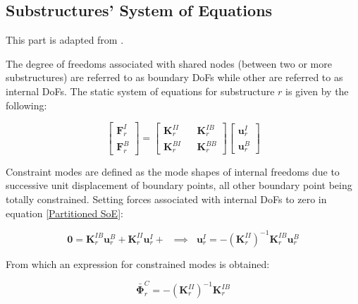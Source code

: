 \documentclass[../DomainDecomposition.tex]{subfiles}
\begin{document}
 

\subsection{Substructures' System of Equations}

This part is adapted from \cite{craig1968coupling}. 
\vspace{10pt} 

The degree of freedoms associated with shared nodes (between two or more substructures) are referred to as boundary DoFs while other are referred to as internal DoFs. 
The static system of equations for substructure $r$ is given by the following: 

\begin{equation}
    \begin{bmatrix}
        \mathbf{F}_{r}^{I} \\ 
        \mathbf{F}_{r}^{B} 
    \end{bmatrix}
    =
    \begin{bmatrix}
        \mathbf{K}_{r}^{II} && 
        \mathbf{K}_{r}^{IB} \\ 
        \mathbf{K}_{r}^{BI} && 
        \mathbf{K}_{r}^{BB} 
    \end{bmatrix} 
    \begin{bmatrix}
        \mathbf{u}_{r}^{I} \\ 
        \mathbf{u}_{r}^{B} 
    \end{bmatrix} 
    \label{Partitioned SoE} 
\end{equation}

Constraint modes are defined as the mode shapes of internal freedoms due to successive unit displacement of boundary points, all other boundary point being totally constrained. 
Setting forces associated with internal DoFs to zero in equation \eqref{Partitioned SoE}: 

\begin{equation*}
    \mathbf{0} 
    =
    \mathbf{K}_{r}^{IB} \mathbf{u}_{r}^{B} + 
    \mathbf{K}_{r}^{II} \mathbf{u}_{r}^{I} + 
    \phantom{x}
    \implies
    \phantom{x}
    \mathbf{u}_{r}^{I} 
    =
    -\left(\mathbf{K}_{r}^{II}\right)^{-1} 
    \mathbf{K}_{r}^{IB} \mathbf{u}_{r}^{B} 
\end{equation*}

From which an expression for constrained modes is obtained: 

\begin{equation}
    \bar{\mathbf{\Phi}}_{r}^{C}
    =
    -\left(\mathbf{K}_{r}^{II}\right)^{-1} 
    \mathbf{K}_{r}^{IB} 
\end{equation}
\end{document}
